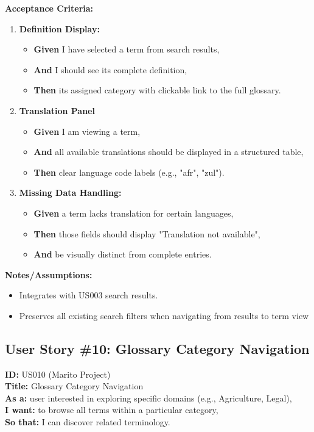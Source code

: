 \documentclass[12pt]{article}
\begin{document}
\vspace{1em}
\textbf{Acceptance Criteria:}
\begin{enumerate}
    \item \textbf{Definition Display:}
    \begin{itemize}
        \item \textbf{Given} I have selected a term from search results,
        \item \textbf{And}  I should see its complete definition,
        \item \textbf{Then} its assigned category with clickable link to the full glossary.
    \end{itemize}

    \item \textbf{Translation Panel}
    \begin{itemize}
        \item \textbf{Given} I am viewing a term,
        \item \textbf{And} all available translations should be displayed in a structured table,
        \item \textbf{Then} clear language code labels (e.g., "afr", "zul").
    \end{itemize}

    \item \textbf{Missing Data Handling:}
    \begin{itemize}
        \item \textbf{Given} a term lacks translation for certain languages,
        \item \textbf{Then} those fields should display "Translation not available",
        \item \textbf{And} be visually distinct from complete entries.
    \end{itemize}
\end{enumerate}

\vspace{1em}
\textbf{Notes/Assumptions:}
\begin{itemize}
    \item Integrates with US003 search results.
    \item Preserves all existing search filters when navigating from results to term view
\end{itemize}

\subsection{User Story \#10: Glossary Category Navigation}
\textbf{ID:} US010 (Marito Project) \\
\textbf{Title:} Glossary Category Navigation \\
\textbf{As a:} user interested in exploring specific domains (e.g., Agriculture, Legal), \\
\textbf{I want:} to browse all terms within a particular category,\\
\textbf{So that:} I can discover related terminology.
\end{document}
